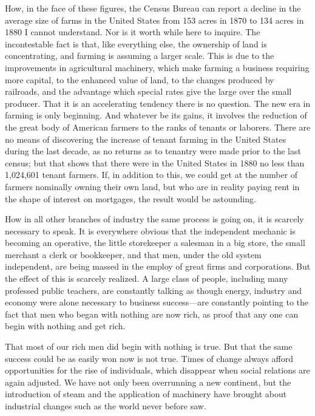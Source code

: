 \documentclass{book}
\begin{document}
How, in the face of these figures, the Census Bureau can report a decline in the average size of farms in the United States from 153 acres in 1870 to 134 acres in 1880 I cannot understand. Nor is it worth while here to inquire. The incontestable fact is that, like everything else, the ownership of land is concentrating, and farming is assuming a larger scale. This is due to the improvements in agricultural machinery, which make farming a business requiring more capital, to the enhanced value of land, to the changes produced by railroads, and the advantage which special rates give the large over the small producer. That it is an accelerating tendency there is no question. The new era in farming is only beginning. And whatever be its gains, it involves the reduction of the great body of American farmers to the ranks of tenants or laborers. There are no means of discovering the increase of tenant farming in the United States during the last decade, as no returns as to tenantry were made prior to the last census; but that shows that there were in the United States in 1880 no less than 1,024,601 tenant farmers. If, in addition to this, we could get at the number of farmers nominally owning their own land, but who are in reality paying rent in the shape of interest on mortgages, the result would be astounding.

How in all other branches of industry the same process is going on, it is scarcely necessary to speak. It is everywhere obvious that the independent mechanic is becoming an operative, the little storekeeper a salesman in a big store, the small merchant a clerk or bookkeeper, and that men, under the old system independent, are being massed in the employ of great firms and corporations. But the effect of this is scarcely realized. A large class of people, including many professed public teachers, are constantly talking as though energy, industry and economy were alone necessary to business success—are constantly pointing to the fact that men who began with nothing are now rich, as proof that any one can begin with nothing and get rich.

That most of our rich men did begin with nothing is true. But that the same success could be as easily won now is not true. Times of change always afford opportunities for the rise of individuals, which disappear when social relations are again adjusted. We have not only been overrunning a new continent, but the introduction of steam and the application of machinery have brought about industrial changes such as the world never before saw.
\end{document}
